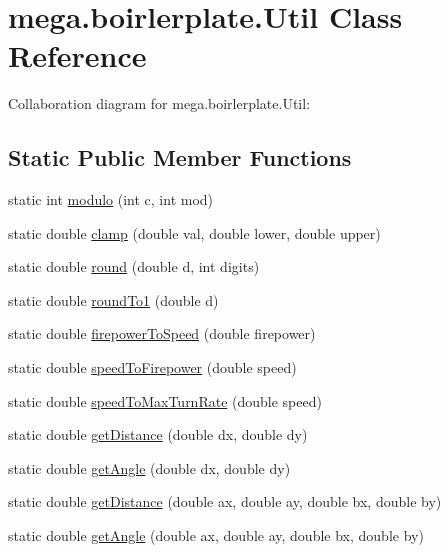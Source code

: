 \hypertarget{classmega_1_1boirlerplate_1_1_util}{}\section{mega.\+boirlerplate.\+Util Class Reference}
\label{classmega_1_1boirlerplate_1_1_util}


Collaboration diagram for mega.\+boirlerplate.\+Util\+:
\subsection*{Static Public Member Functions}
\begin{DoxyCompactItemize}
\item 
static int \hyperlink{classmega_1_1boirlerplate_1_1_util_acaa157e0a60ec0b1ea5e9fcb0dd61e4d}{modulo} (int c, int mod)
\item 
static double \hyperlink{classmega_1_1boirlerplate_1_1_util_a85f19029e7c0d7d4f294508d6879f3dc}{clamp} (double val, double lower, double upper)
\item 
static double \hyperlink{classmega_1_1boirlerplate_1_1_util_a255c3c9ecd1af27e6566822f4eeb83e7}{round} (double d, int digits)
\item 
static double \hyperlink{classmega_1_1boirlerplate_1_1_util_af268ebc7c028bce1824d7ba883c0af7c}{round\+To1} (double d)
\item 
static double \hyperlink{classmega_1_1boirlerplate_1_1_util_a87b170f43206b1f1560fcea48cd51876}{firepower\+To\+Speed} (double firepower)
\item 
static double \hyperlink{classmega_1_1boirlerplate_1_1_util_a66f5757c5ac6ab4614fa72cc9174e7c7}{speed\+To\+Firepower} (double speed)
\item 
static double \hyperlink{classmega_1_1boirlerplate_1_1_util_a4b64841d046d559840b1f7a0096e6e9c}{speed\+To\+Max\+Turn\+Rate} (double speed)
\item 
static double \hyperlink{classmega_1_1boirlerplate_1_1_util_a4cda52df9b898c808599f03fd63b88d4}{get\+Distance} (double dx, double dy)
\item 
static double \hyperlink{classmega_1_1boirlerplate_1_1_util_a2990805eef3f1de7aa2856009d714358}{get\+Angle} (double dx, double dy)
\item 
static double \hyperlink{classmega_1_1boirlerplate_1_1_util_a5a29f4d77f349eb00f4d2b8ed9b86860}{get\+Distance} (double ax, double ay, double bx, double by)
\item 
static double \hyperlink{classmega_1_1boirlerplate_1_1_util_a5cd5f72724bc1543b09bfc0211474987}{get\+Angle} (double ax, double ay, double bx, double by)

\end{DoxyCompactItemize}
